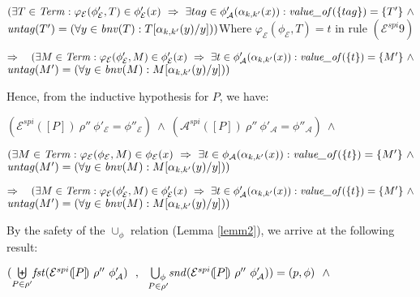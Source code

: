 \documentclass[10pt,a4paper,final,oneside,fleqn]{book}
\begin{document}
\noindent
$(\exists T\in\mbox{{\itshape Term\/}}:\varphi_\mathcal{E}(\phi'_\mathcal{E},T)\in\phi'_\mathcal{E}(x)~\Rightarrow~\exists tag\in\phi'_\mathcal{A}(\alpha_{k,k'}(x)): \mbox{{\itshape value\_of\/}}(\{tag\})=\{T'\}~\wedge$\\
$\mbox{{\itshape untag\/}}(T')=(\forall y\in\mbox{{\itshape bnv\/}}(T):T[\alpha_{k,k'}(y)/y]))$\hfill Where $\varphi_\mathcal{E}(\phi_\mathcal{E},T)=t$ in rule $(\mathcal{E}^{spi} 9)$\vspace{5mm}

\noindent
$\Rightarrow~~~(\exists M\in\mbox{{\itshape Term\/}}:\varphi_\mathcal{E}(\phi'_\mathcal{E},M)\in\phi'_\mathcal{E}(x)~\Rightarrow~\exists t\in\phi'_\mathcal{A}(\alpha_{k,k'}(x)): \mbox{{\itshape value\_of\/}}(\{t\})=\{M'\}~\wedge$\\
$\mbox{{\itshape untag\/}}(M')=(\forall y\in\mbox{{\itshape bnv\/}}(M):M[\alpha_{k,k'}(y)/y]))$\vspace{5mm}

\noindent
Hence, from the inductive hypothesis for $P$, we have:

\noindent
$(\mathcal{E}^{spi}(\![P]\!)~\rho''~\phi'_{\mathcal{E}}=\phi''_\mathcal{E})~\wedge~(\mathcal{A}^{spi}(\![P]\!)~\rho''~\phi'_{\mathcal{A}}=\phi''_\mathcal{A})~\wedge~$

\noindent
$(\exists M\in\mbox{{\itshape Term\/}}:\varphi_\mathcal{E}(\phi_\mathcal{E},M)\in\phi_\mathcal{E}(x)~\Rightarrow~\exists t\in\phi_\mathcal{A}(\alpha_{k,k'}(x)):\mbox{{\itshape value\_of\/}}(\{t\})=\{M'\}~\wedge$\\
$\mbox{{\itshape untag\/}}(M')=(\forall y\in\mbox{{\itshape bnv\/}}(M):M[\alpha_{k,k'}(y)/y]))$\vspace{5mm}

\noindent
$\Rightarrow~~~(\exists M\in\mbox{{\itshape Term\/}}:\varphi_\mathcal{E}(\phi'_\mathcal{E},M)\in\phi'_\mathcal{E}(x)~\Rightarrow~\exists t\in\phi'_\mathcal{A}(\alpha_{k,k'}(x)): \mbox{{\itshape value\_of\/}}(\{t\})=\{M'\}~\wedge$\\
$\mbox{{\itshape untag\/}}(M')=(\forall y\in\mbox{{\itshape bnv\/}}(M):M[\alpha_{k,k'}(y)/y]))$\vspace{5mm}

\noindent
By the safety of the $\cup_\phi$ relation (Lemma \ref{lemm2}), we arrive at the following result:

\noindent
$(\underset{P\in\rho'}{\biguplus}\mbox{{\itshape fst\/}}(\mathcal{E}^{spi}(\![P]\!)~\rho''~\phi'_\mathcal{A})~~,~~\underset{P\in\rho'}{\bigcup_\phi}\mbox{{\itshape snd\/}}(\mathcal{E}^{spi}(\![P]\!)~\rho''~\phi'_\mathcal{A}))=(p,\phi)~~\wedge$
\end{document}
